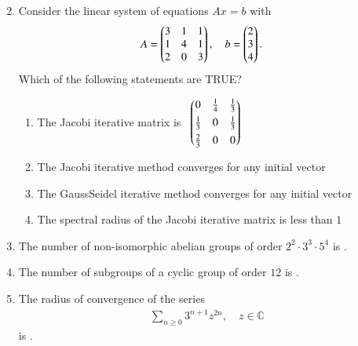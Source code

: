 \documentclass[journal,12pt,onecolumn]{IEEEtran}
\theoremstyle{remark}
\begin{document}
\begin{enumerate}
\begin{enumerate}
\begin{multicols}{2}
\end{multicols}
\end{enumerate}

\item Consider the linear system of equations $Ax=b$ with
\begin{align*}
A &= \begin{pmatrix}3 & 1 & 1 \\ 1 & 4 & 1 \\ 2 & 0 & 3\end{pmatrix}, \quad
b = \begin{pmatrix}2 \\ 3 \\ 4\end{pmatrix}.
\end{align*}
Which of the following statements are TRUE?

\hfill{}

\begin{enumerate}
\item The Jacobi iterative matrix is ~$\begin{pmatrix}0 & \tfrac{1}{4} & \tfrac{1}{3} \\[4pt]
\tfrac{1}{3} & 0 & \tfrac{1}{3} \\[4pt]
\tfrac{2}{3} & 0 & 0\end{pmatrix}$

\item The Jacobi iterative method converges for any initial vector
\item The Gauss\textendash Seidel iterative method converges for any initial vector
\item The spectral radius of the Jacobi iterative matrix is less than $1$
\end{enumerate}

\item The number of non-isomorphic abelian groups of order $2^{2}\cdot 3^{3}\cdot 5^{4}$ is \underline{\hspace{2cm}}.

\hfill{}

\item The number of subgroups of a cyclic group of order $12$ is \underline{\hspace{2cm}}.

\hfill{}
\newpage
\item The radius of convergence of the series
\begin{align*}
\sum_{n\ge 0} 3^{n+1} z^{2n}, \quad z\in \mathbb{C}
\end{align*}
is  \underline{\hspace{2cm}}.

\hfill{}


\end{enumerate}
\end{document}
